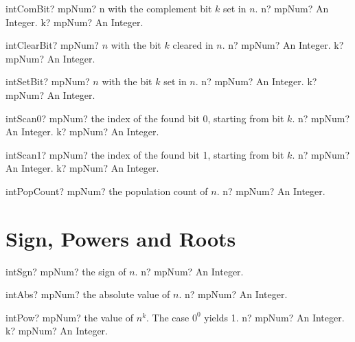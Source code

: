\documentclass[12pt,a4paper,openany]{book}
\begin{document}
\begin{mpFunctionsExtract}
\mpFunctionTwo
{intComBit? mpNum? n with the complement bit $k$ set in $n$.}
{n? mpNum? An Integer.}
{k? mpNum? An Integer.}
\end{mpFunctionsExtract}

\begin{mpFunctionsExtract}
\mpFunctionTwo
{intClearBit? mpNum? $n$ with the bit $k$ cleared in $n$.}
{n? mpNum? An Integer.}
{k? mpNum? An Integer.}
\end{mpFunctionsExtract}

\begin{mpFunctionsExtract}
\mpFunctionTwo
{intSetBit? mpNum? $n$ with the bit $k$ set in $n$.}
{n? mpNum? An Integer.}
{k? mpNum? An Integer.}
\end{mpFunctionsExtract}

\begin{mpFunctionsExtract}
\mpFunctionTwo
{intScan0? mpNum? the index of the found bit 0, starting from bit $k$.}
{n? mpNum? An Integer.}
{k? mpNum? An Integer.}
\end{mpFunctionsExtract}

\begin{mpFunctionsExtract}
\mpFunctionTwo
{intScan1? mpNum? the index of the found bit 1, starting from bit $k$.}
{n? mpNum? An Integer.}
{k? mpNum? An Integer.}
\end{mpFunctionsExtract}

\begin{mpFunctionsExtract}
\mpFunctionOne
{intPopCount? mpNum? the population count of $n$.}
{n? mpNum? An Integer.}
\end{mpFunctionsExtract}

\section{Sign, Powers and Roots}

\begin{mpFunctionsExtract}
\mpFunctionOne
{intSgn? mpNum? the sign of $n$.}
{n? mpNum? An Integer.}
\end{mpFunctionsExtract}

\begin{mpFunctionsExtract}
\mpFunctionOne
{intAbs? mpNum? the absolute value of $n$.}
{n? mpNum? An Integer.}
\end{mpFunctionsExtract}

\begin{mpFunctionsExtract}
\mpFunctionTwo
{intPow? mpNum? the value of $n^k$. The case $0^0$ yields 1.}
{n? mpNum? An Integer.}
{k? mpNum? An Integer.}
\end{mpFunctionsExtract}
\end{document}
